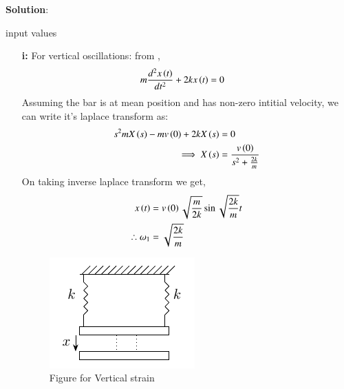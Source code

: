 \documentclass[journal,12pt,twocolumn]{IEEEtran}
\theoremstyle{remark}
\begin{document}
\textbf{Solution}:\\
\begin{table}[h!] 
\centering

\caption{input values}
\label{tab: Table ae63}
\end{table}
\begin{enumerate}
    \item [\textbf{i:}] For vertical oscillations: from ,
    \begin{align}
        m\frac{d^2x\left(t\right)}{dt^2} + 2kx\left(t\right) &=0
    \end{align}
    Assuming the bar is at mean position and has non-zero intitial velocity, we can write it's laplace transform as:
    \begin{align}
        s^2mX\left(s\right)-mv\left(0\right)+ 2kX\left(s\right)&=0\\
        \implies X\left(s\right) &= \frac{v\left(0\right)}{s^2 + \frac{2k}{m}}
    \end{align}
    On taking inverse laplace transform we get,
    \begin{align}
        x\left(t\right) &= v\left(0\right)\sqrt{\frac{m}{2k}}\sin{\sqrt{\frac{2k}{m}}t}\\
        \therefore \omega_1 &= \sqrt{\frac{2k}{m}} \label{eq:gate63_1}
    \end{align}

\begin{figure}[h!]
    \includegraphics[width = \columnwidth]{figs/fig1.pdf}
    \caption{Figure for Vertical strain}
    \centering
    \label{fig: nm_63_fig_2}
\end{figure}


\end{enumerate}
\end{document}
